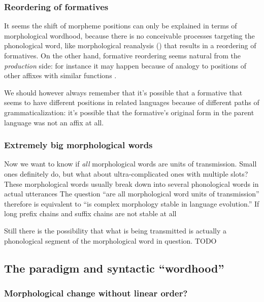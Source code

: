 \documentclass[a4paper, oneside, scheme=plain, 12pt]{article}
\newcommand*{\citepage}[1]{p.~{#1}}
\begin{document}
\subsubsection{Reordering of formatives}\label{sec:reordering-of-formative}

It seems the shift of morpheme positions can only be explained in terms of morphological wordhood,
because there is no conceivable processes targeting the phonological word,
like morphological reanalysis () that results in a reordering of formatives.
On the other hand, formative reordering seems natural from the \emph{production} side:
for instance it may happen because of analogy to positions of other affixes with similar functions
\citep[\citepage{252}]{campbell2013historical}.

We should however always remember that it's possible that
a formative that seems to have different positions in related languages
because of different paths of grammaticalization:
it's possible that the formative's original form in the parent language was not an affix at all.

\subsubsection{Extremely big morphological words}\label{sec:extremely-big-morphological-words}

Now we want to know if \emph{all} morphological words are units of transmission.
Small ones definitely do, but what about ultra-complicated ones with multiple slots?
These morphological words usually break down into several phonological words in actual utterances 
The question ``are all morphological word units of transmission'' therefore is equivalent to 
``is complex morphology stable in language evolution.''
If long prefix chains and suffix chains are not stable at all

Still there is the possibility that what is being transmitted is actually
a phonological segment of the morphological word in question.
TODO



\subsection{The paradigm and syntactic ``wordhood''}

\subsubsection{Morphological change without linear order?}\label{sec:morphological-change-based-on-syntactic-word}
\end{document}
